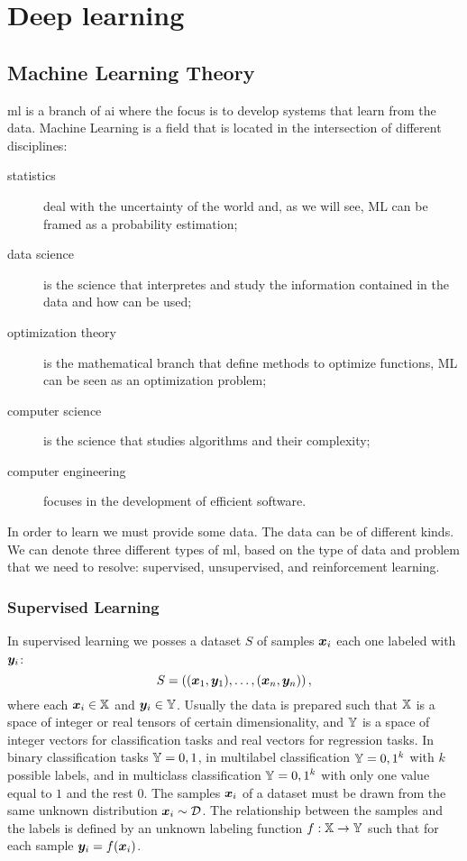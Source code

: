 \chapter{Deep learning}
\section{Machine Learning Theory}
\ac{ml} is a branch of \ac{ai}
where the focus is to develop systems that learn from the
data. Machine Learning is a field that is located in the intersection
of different disciplines:
\begin{description}
\item[statistics] deal with the uncertainty of the world and, as we
  will see, ML can be framed as a probability estimation;
\item[data science] is the science that interpretes and study the
  information contained in the data and how can be used;
\item[optimization theory] is the mathematical branch that define
  methods to optimize functions, ML can be seen as an optimization
  problem;
\item[computer science] is the science that studies algorithms and
  their complexity;
\item[computer engineering] focuses in the development of efficient
  software.
\end{description}

In order to learn we must provide some data. The data can be of
different kinds. We can denote three different types of \ac{ml}, based
on the type of data and problem that we need to resolve: supervised,
unsupervised, and reinforcement learning.

\subsection{Supervised Learning}\label{sec:supervisedTheory}
In supervised learning we posses a dataset $S$ of samples $\bm{x}_i$
each one labeled with $\bm{y}_i$:
\begin{equation*}
  S=\left((\bm{x}_1,\bm{y}_1),\dots,(\bm{x}_n,\bm{y}_n)\right),
\end{equation*}
where each $\bm{x}_i\in\mathbb{X}$ and $\bm{y}_i\in\mathbb{Y}$. Usually the
data is prepared such that $\mathbb{X}$ is a space of integer or real
tensors of certain dimensionality, and $\mathbb{Y}$ is a space of integer
vectors for classification tasks and real vectors for regression
tasks. In binary classification tasks $\mathbb{Y}={0,1}$, in multilabel
classification $\mathbb{Y}={0,1}^k$ with $k$ possible labels, and in
multiclass classification $\mathbb{Y}={0,1}^k$ with only one value equal to
$1$ and the rest $0$. The samples $\bm{x}_i$ of a dataset must be
drawn from the same unknown distribution $\bm{x}_i\sim\mathcal{D}$. The
relationship between the samples and the labels is defined by an unknown
labeling function $f:\mathbb{X}\rightarrow\mathbb{Y}$ such that for each sample
$\bm{y}_i=f(\bm{x}_i)$.

